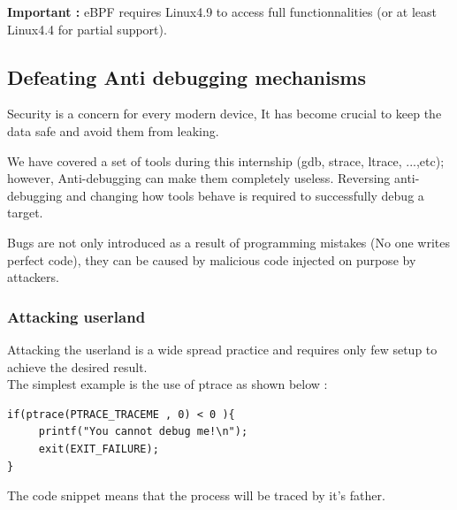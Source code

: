 \textbf{\color{red}Important : } eBPF requires Linux4.9 to access full functionnalities (or at least Linux4.4 for partial support).

\subsection{Defeating Anti debugging mechanisms}
Security is a concern for every modern device, It has become crucial to keep the data safe and avoid them from leaking.\\

\begin{center}
\begin{mdframed}[
        linecolor=red,linewidth=2pt,%
        frametitlerule=true,%
        apptotikzsetting={\tikzset{mdfframetitlebackground/.append style={%
            shade,left color=white, right color=blue!20}}}, 
        frametitlerulecolor=blue,
        frametitlerulewidth=1pt, innertopmargin=\topskip,
        frametitle={Anti-debugging stops debugging tools},
        outerlinewidth=1.25pt
    ]
	We have covered a set of tools during this internship (gdb, strace, ltrace, ...,etc); however, Anti-debugging can make them completely useless. Reversing anti-debugging and changing how tools behave is required to successfully debug a target.\\

\end{mdframed}
\end{center}


Bugs are not only introduced as a result of programming mistakes (No one writes perfect code), they can be caused by malicious code injected on purpose by attackers.

\subsubsection{Attacking userland}
Attacking the userland is a wide spread practice and requires only few setup to achieve the desired result.\\

The simplest example is the use of ptrace as shown below :
	\begin{lstlisting}[style=CStyle]
if(ptrace(PTRACE_TRACEME , 0) < 0 ){
     printf("You cannot debug me!\n");
     exit(EXIT_FAILURE);
}
    	\end{lstlisting}
The code snippet means that the process will be traced by it's father. \\

